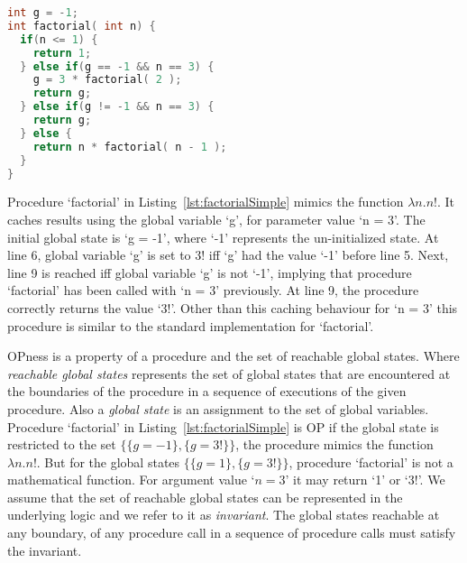 \documentclass{llncs}
\begin{document}
\begin{lstlisting}[language=c, caption= {Procedure `factorial' :
      returns factorial of `n' and memoizes result for argument value
      `3'.}, label=lst:factorialSimple]
int g = -1;
int factorial( int n) {
  if(n <= 1) {
    return 1;
  } else if(g == -1 && n == 3) {
    g = 3 * factorial( 2 );
    return g;
  } else if(g != -1 && n == 3) {
    return g;
  } else {
    return n * factorial( n - 1 );
  }
}
\end{lstlisting}

Procedure `factorial' in Listing~\ref{lst:factorialSimple} mimics the
function $\lambda n. n!$. It caches results using the global variable
`g', for parameter value `n = 3'. The initial global state is `g =
-1', where `-1' represents the un-initialized state. At line 6, global
variable `g' is set to 3! iff `g' had the value `-1' before line
5. Next, line 9 is reached iff global variable `g' is not `-1',
implying that procedure `factorial' has been called with `n = 3'
previously. At line 9, the procedure correctly returns the value
`3!'. Other than this caching behaviour for `n = 3' this procedure is
similar to the standard implementation for `factorial'.

OPness is a property of a procedure and the set of reachable global
states. Where \textit{reachable global states} represents the set of
global states that are encountered at the boundaries of the procedure
in a sequence of executions of the given procedure. Also a
\textit{global state} is an assignment to the set of global
variables. Procedure `factorial' in Listing~\ref{lst:factorialSimple}
is OP if the global state is restricted to the set $\{\{g = -1\}, \{g
= 3!\}\}$, the procedure mimics the function $\lambda n.n!$. But for
the global states $\{\{g = 1\}, \{g = 3!\}\}$, procedure `factorial'
is not a mathematical function. For argument value `$n = 3$' it may
return `1' or `3!'.  We assume that the set of reachable global states
can be represented in the underlying logic and we refer to it as
\textit{invariant}.  The global states reachable at any boundary, of
any procedure call in a sequence of procedure calls must satisfy the
invariant.
\end{document}
